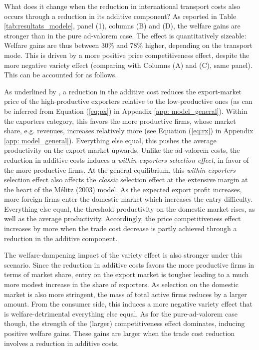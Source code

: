 \documentclass[a4paper,11pt]{article}
\begin{document}
What does it change when the reduction in international transport costs also occurs
through a reduction in its additive component? As reported in Table \ref{tab:resultats_modele}, panel (1), columns (B) and (D), the welfare gains are stronger than in the pure ad-valorem case. The effect is quantitatively sizeable: Welfare gains are thus between 30\% and 78\% higher, depending on the transport mode. This is driven by a more positive price competitiveness effect, despite the more negative variety effect (comparing with Columns (A) and (C), same panel). This can be accounted for as follows.

As underlined by \cite{sorensen2014}, a reduction in the additive cost reduces the export-market price of the high-productive
exporters relative to the low-productive ones (as can be inferred from Equation (\ref{eq:px}) in Appendix \ref{app: model_general}).
Within the exporters category, this favors the more productive firms, whose market share,
e.g. revenues, increases relatively more (see Equation (\ref{eq:rx}) in Appendix \ref{app: model_general}). Everything else equal, this
pushes the average productivity on the export market upwards. Unlike the ad-valorem
costs, the reduction in additive costs induces a \textit{within-exporters selection effect}, in favor of
the more productive firms. At the general equilibrium, this \textit{within-exporters} selection effect
also affects the \textit{classic} selection effect at the extensive margin at the heart of the M\'{e}litz
(2003) model. As the expected export profit increases, more foreign firms enter the domestic market which increases the entry difficulty. Everything else equal, the threshold productivity
on the domestic market rises, as well as the average productivity. Accordingly, the
price competitiveness effect increases by more when the trade cost decrease is partly achieved through a reduction
in the additive component.

The welfare-dampening impact of the variety effect is also stronger under this scenario. Since the reduction in additive costs favors the more productive firms in terms of market share, entry on the export market is tougher leading to a much more modest increase in the
share of exporters. As selection on the domestic market is also more stringent, the
mass of total active firms reduces by a larger amount. From the consumer side, this induces
a more negative variety effect that is welfare-detrimental everything else equal. As for the
pure-ad-valorem case though, the strength of the (larger) competitiveness effect dominates,
inducing positive welfare gains. These gains are larger when the trade cost reduction involves a
reduction in additive costs.\medskip
\end{document}
